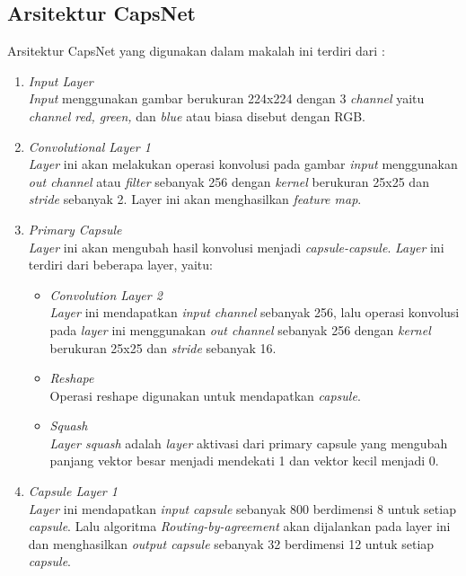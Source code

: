 \documentclass{article}
\begin{document}
		\subsection{Arsitektur CapsNet}
		Arsitektur CapsNet yang digunakan dalam makalah ini terdiri dari :
		\begin{enumerate}
			\item \textit{Input Layer}\\
			\textit{Input} menggunakan gambar berukuran 224x224 dengan 3 \textit{channel} yaitu \textit{channel red, green,} dan \textit{blue} atau biasa disebut dengan RGB.
			
			\item \textit{Convolutional Layer 1}\\
			\textit{Layer} ini akan melakukan operasi konvolusi pada gambar \textit{input} menggunakan \textit{out channel} atau \textit{filter} sebanyak 256 dengan \textit{kernel} berukuran 25x25 dan \textit{stride} sebanyak 2. Layer ini akan menghasilkan \textit{feature map}.
			
			\item \textit{Primary Capsule}\\
			\textit{Layer} ini akan mengubah hasil konvolusi menjadi \textit{capsule-capsule}. \textit{Layer} ini terdiri dari beberapa layer, yaitu:
			\begin{itemize}
				\item \textit{Convolution Layer 2}\\ 
				\textit{Layer} ini mendapatkan \textit{input channel} sebanyak 256, lalu operasi konvolusi pada \textit{layer} ini menggunakan \textit{out channel} sebanyak 256 dengan \textit{kernel} berukuran 25x25  dan \textit{stride} sebanyak 16.
				
				\item \textit{Reshape}\\
				Operasi reshape digunakan untuk mendapatkan \textit{capsule}.
				
				\item \textit{Squash}\\
				\textit{Layer squash} adalah \textit{layer} aktivasi dari primary capsule yang mengubah panjang vektor besar menjadi mendekati 1 dan vektor kecil menjadi 0.
			\end{itemize}
			
			\item \textit{Capsule Layer 1}\\
			\textit{Layer} ini mendapatkan \textit{input capsule} sebanyak 800 berdimensi 8 untuk setiap \textit{capsule}. Lalu algoritma \textit{Routing-by-agreement} akan dijalankan pada layer ini dan menghasilkan \textit{output capsule} sebanyak 32 berdimensi 12 untuk setiap \textit{capsule}.
			

\end{enumerate}
\end{document}
